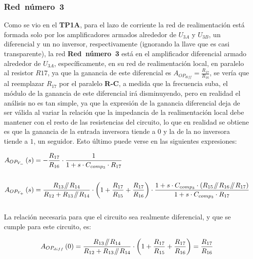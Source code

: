 \subsubsection{\textbf{Red~número~3}}

Como se vio en el \textbf{TP1A}, para el lazo de corriente la red de realimentación está formada solo por los amplificadores armados alrededor de $U_{3A}$ y $U_{3B}$, un diferencial y un no inversor, respectivamente (ignorando la llave que es casi transparente), la red \textbf{Red~número~3} está en el amplificador diferencial armado alrededor de $U_{3A}$, específicamente,  en su red de realimentación local, en paralelo al resistor $R17$, ya que la ganancia de este diferencial es $A_{OP_{diff}} = \frac{R_{17}}{R_{16}}$, se vería que al reemplazar $R_{17}$ por el paralelo \textbf{R-C}, a medida que la frecuencia suba, el módulo de la ganancia de este diferencial irá disminuyendo, pero en realidad el análisis no es tan simple, ya que la expresión de la ganancia diferencial deja de ser válida al variar la relación que la impedancia de la realimentación local debe mantener con el resto de las resistencias del circuito, lo que en realidad se obtiene es que la ganancia de la entrada inversora tiende a $0$ y la de la no inversora tiende a $1$, un seguidor. Esto último puede verse en las siguientes expresiones:


\begin{align}
\begin{split}
A_{OP_{V_{-}}}\left( s \right) &= - \frac{R_{17}}{R_{16}} \cdot \frac{1}{1 + s \cdot C_{comp_{3}} \cdot R_{17}  }
\\\\
A_{OP_{V_{+}}}\left( s \right) &= \frac{ R_{13} \parallelresistors R_{14}  }{ R_{12} + R_{13} \parallelresistors R_{14} } \cdot \left( 1 + \frac{R_{17}}{R_{15}} + \frac{R_{17}}{R_{16}} \right) \cdot \frac{ 1 + s \cdot C_{comp_{3}} \cdot \left(  R_{15} \parallelresistors R_{16} \parallelresistors R_{17}   \right) }{1 + s \cdot C_{comp_{3}} \cdot R_{17} }
\end{split}
\end{align}\\

La relación necesaria para que el circuito sea realmente diferencial, y que se cumple para este circuito, es:

\begin{equation}
A_{OP_{diff}}\left( 0 \right) = \frac{ R_{13} \mathbin{\!/\mkern-5mu/\!} R_{14}  }{ R_{12} + R_{13} \mathbin{\!/\mkern-5mu/\!} R_{14} } \cdot \left( 1 + \frac{R_{17}}{R_{15}} + \frac{R_{17}}{R_{16}} \right) = \frac{R_{17}}{R_{16}}
\end{equation}\\

